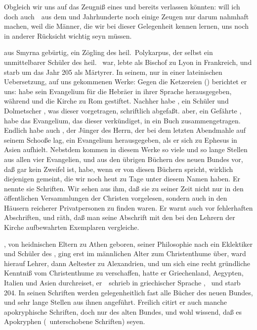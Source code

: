Obgleich wir uns auf das Zeugniß eines  und  bereits verlassen könnten: will ich doch auch~\ aus dem  und  Jahrhunderte noch einige Zeugen nur darum nahmhaft machen, weil die Männer, die wir bei dieser Gelegenheit kennen lernen, uns noch in anderer Rücksicht wichtig seyn müssen.
\begin{aufza}
\item {} aus Smyrna gebürtig, ein Zögling des heil.\ Polykarpus, der selbst ein unmittelbarer Schüler des heil.\  war, lebte als Bischof zu Lyon in Frankreich, und starb um das Jahr 205 als Märtyrer. In seinem, nur in einer lateinischen Uebersetzung, auf uns gekommenen Werke: Gegen die Ketzereien () berichtet er uns:  habe sein Evangelium für die Hebräer in ihrer Sprache herausgegeben, während  und  die Kirche zu Rom gestiftet. Nachher habe , ein Schüler und Dolmetscher , was dieser vorgetragen, schriftlich abgefaßt.  aber, ein Gefährte , habe das Evangelium, das dieser verkündiget, in ein Buch zusammengetragen. Endlich habe auch , der Jünger des Herrn, der bei dem letzten Abendmahle auf seinem Schooße lag, ein Evangelium herausgegeben, als er sich zu Ephesus in Asien aufhielt. Nebstdem kommen in diesem Werke so viele und so lange Stellen aus allen vier Evangelien, und aus den übrigen Büchern des neuen Bundes vor, daß gar kein Zweifel ist,  habe, wenn er von diesen Büchern spricht, wirklich diejenigen gemeint, die wir noch heut zu Tage unter diesem Namen haben. Er nennte sie  Schriften. Wir sehen aus ihm, daß sie zu seiner Zeit nicht nur in den öffentlichen Versammlungen der Christen vorgelesen, sondern auch in den Häusern reicherer Privatpersonen zu finden waren. Er warnt auch vor fehlerhaften Abschriften, und räth, daß man seine Abschrift mit den bei den Lehrern der Kirche aufbewahrten Exemplaren vergleiche.
\item {}, von heidnischen Eltern zu Athen geboren, seiner Philosophie nach ein Eklektiker und Schüler des , ging erst im männlichen Alter zum Christenthume über, ward hierauf Lehrer, dann Aeltester zu Alexandrien, und um sich eine recht gründliche Kenntniß vom Christenthume zu verschaffen, hatte er Griechenland, Aegypten, Italien und Asien durchreiset, er~\ schrieb in griechischer Sprache , \umA\  und starb 204. In seinen Schriften werden gelegenheitlich fast alle Bücher des neuen Bundes, und sehr lange Stellen aus ihnen angeführt. Freilich citirt er auch manche apokryphische Schriften, doch nur des alten Bundes, und wohl wissend, daß es Apokryphen (\dh\ unterschobene Schriften) seyen.

\end{aufza}
